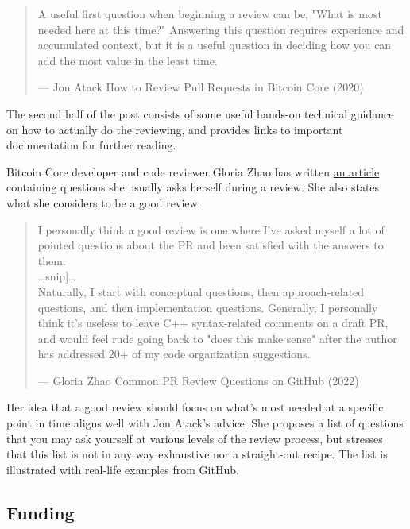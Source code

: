 \begin{quote}
A useful first question when beginning a review can be, "What is most
needed here at this time?" Answering this question requires experience
and accumulated context, but it is a useful question in deciding how you
can add the most value in the least time.

---  Jon Atack How to Review Pull Requests in Bitcoin Core (2020)
\end{quote}

The second half of the post consists of some useful hands-on technical
guidance on how to actually do the reviewing, and provides links to
important documentation for further reading.

Bitcoin Core developer and code reviewer Gloria Zhao has written
\href{https://github.com/glozow/bitcoin-notes/blob/master/review-checklist.md}{an
article} containing questions she usually asks herself during a review.
She also states what she considers to be a good review.

\begin{quote}
I personally think a good review is one where I've asked myself a lot of
pointed questions about the PR and been satisfied with the answers to
them.\\
\ldots\hspace{0pt}{[}snip{]}\ldots\hspace{0pt}\\
Naturally, I start with conceptual questions, then approach-related
questions, and then implementation questions. Generally, I personally
think it's useless to leave C++ syntax-related comments on a draft PR,
and would feel rude going back to "does this make sense" after the
author has addressed 20+ of my code organization suggestions.

---  Gloria Zhao Common PR Review Questions on GitHub (2022)
\end{quote}

Her idea that a good review should focus on what's most needed at a
specific point in time aligns well with Jon Atack's advice. She proposes
a list of questions that you may ask yourself at various levels of the
review process, but stresses that this list is not in any way exhaustive
nor a straight-out recipe. The list is illustrated with real-life
examples from GitHub.

\hypertarget{_funding}{%
\subsection{Funding}\label{_funding}}

